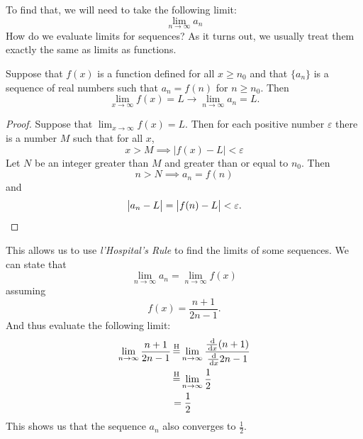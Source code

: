 \begin{ex}
    To find that, we will need to take the following limit:
    \[ \lim_{n\to\infty} a_n \]
    How do we evaluate limits for sequences? As it turns out, we usually treat
    them exactly the same as limits as functions.
    \begin{theorem}\label{inftyanlimit}
      Suppose that \(f(x)\) is a function defined for all \( x \geq n_0\) and
      that \( \{a_n\} \) is a sequence of real numbers such that \(a_n = f(n)\)
      for \(n \geq n_0\). Then
      \[ \lim_{x \to \infty} f(x) = L \to \lim_{n \to \infty} a_n = L\text{.} \]
      \begin{proof}
        Suppose that \( \lim_{x \to \infty} f(x) = L \). Then for each positive
        number \( \varepsilon \) there is a number \( M \) such that for all
        \(x\),
        \[ x > M \implies \big| f(x) - L \big| < \varepsilon \]
        Let \(N\) be an integer greater than \(M\) and greater than or equal to
        \(n_0\). Then
        \[ n > N \implies a_n = f(n)\]
        and
        \[\big|a_n -L \big| = \big|f(n) - L\big| < \varepsilon\text{.} \qedhere\]
      \end{proof} %
    \end{theorem}
    This allows us to use \emph{l'Hospital's Rule} to find the limits of some
    sequences. We can state that
    \[\lim_{n\to\infty} a_n =\lim_{n\to\infty}f(x)\]
    assuming
    \[f(x)=\frac{n+1}{2n-1}\text{.}\]
    And thus evaluate the following limit:
    \begin{align*}
      \lim_{n\to\infty} \frac{n+1}{2n-1}
      &\=H \lim_{n\to\infty} \dfrac{\frac{\ud}{\ud x}(n+1)}{\frac{\ud}{\ud x}2n-1} \\
      &\=H \lim_{n\to\infty} \frac{1}{2} \\
      &= \frac{1}{2}
    \end{align*}
    This shows us that the sequence $a_n$ also converges to \(\frac{1}{2}\).
\end{ex}
